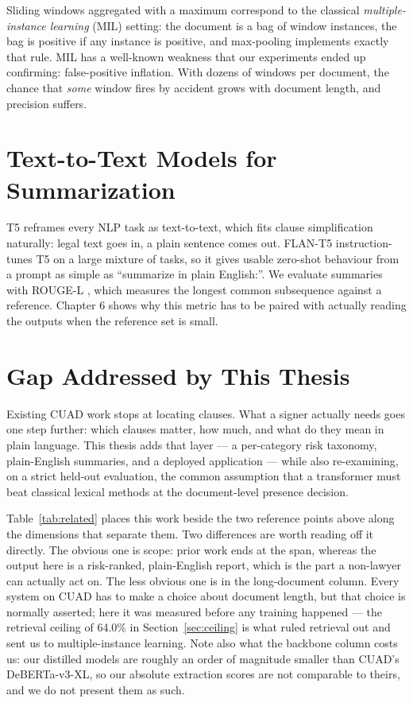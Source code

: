 Sliding windows aggregated with a maximum correspond to the classical \emph{multiple-instance learning} (MIL) setting: the document is a bag of window instances, the bag is positive if any instance is positive, and max-pooling implements exactly that rule. MIL has a well-known weakness that our experiments ended up confirming: false-positive inflation. With dozens of windows per document, the chance that \emph{some} window fires by accident grows with document length, and precision suffers.

\section{Text-to-Text Models for Summarization}
T5 \cite{raffel2020t5} reframes every NLP task as text-to-text, which fits clause simplification naturally: legal text goes in, a plain sentence comes out. FLAN-T5 \cite{chung2022flan} instruction-tunes T5 on a large mixture of tasks, so it gives usable zero-shot behaviour from a prompt as simple as ``summarize in plain English:''. We evaluate summaries with ROUGE-L \cite{lin2004rouge}, which measures the longest common subsequence against a reference. Chapter 6 shows why this metric has to be paired with actually reading the outputs when the reference set is small.

\section{Gap Addressed by This Thesis}
Existing CUAD work stops at locating clauses. What a signer actually needs goes one step further: which clauses matter, how much, and what do they mean in plain language. This thesis adds that layer --- a per-category risk taxonomy, plain-English summaries, and a deployed application --- while also re-examining, on a strict held-out evaluation, the common assumption that a transformer must beat classical lexical methods at the document-level presence decision.

Table~\ref{tab:related} places this work beside the two reference points above along the dimensions that separate them. Two differences are worth reading off it directly. The obvious one is scope: prior work ends at the span, whereas the output here is a risk-ranked, plain-English report, which is the part a non-lawyer can actually act on. The less obvious one is in the long-document column. Every system on CUAD has to make a choice about document length, but that choice is normally asserted; here it was measured before any training happened --- the retrieval ceiling of 64.0\% in Section~\ref{sec:ceiling} is what ruled retrieval out and sent us to multiple-instance learning. Note also what the backbone column costs us: our distilled models are roughly an order of magnitude smaller than CUAD's DeBERTa-v3-XL, so our absolute extraction scores are not comparable to theirs, and we do not present them as such.


